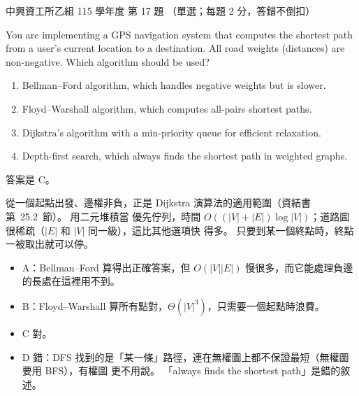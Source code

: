 \begin{pastexam}[label={px:nchu-115-is-17}]{中興資工所乙組 115 學年度 第 17 題}
（單選；每題 2 分，答錯不倒扣）

You are implementing a GPS navigation system that computes the shortest path from a user's
current location to a destination. All road weights (distances) are non-negative. Which
algorithm should be used?
\begin{enumerate}[label=\Alph*.,nosep]
\item Bellman--Ford algorithm, which handles negative weights but is slower.
\item Floyd--Warshall algorithm, which computes all-pairs shortest paths.
\item Dijkstra's algorithm with a min-priority queue for efficient relaxation.
\item Depth-first search, which always finds the shortest path in weighted graphs.
\end{enumerate}
\end{pastexam}

\begin{pastsoln}
答案是 C。

從一個起點出發、邊權非負，正是 Dijkstra 演算法的適用範圍（資結書第~25.2~節）。 用二元堆積當
優先佇列，時間 $O((|V| + |E|) \log |V|)$；道路圖很稀疏（$|E|$ 和 $|V|$ 同一級），這比其他選項快
得多。 只要到某一個終點時，終點一被取出就可以停。
\begin{itemize}
\item A：Bellman--Ford 算得出正確答案，但 $O(|V||E|)$ 慢很多，而它能處理負邊的長處在這裡用不到。
\item B：Floyd--Warshall 算所有點對，$\Theta(|V|^3)$，只需要一個起點時浪費。
\item C 對。
\item D 錯：DFS 找到的是「某一條」路徑，連在無權圖上都不保證最短（無權圖要用 BFS），有權圖
更不用說。 「always finds the shortest path」是錯的敘述。
\end{itemize}
\end{pastsoln}
